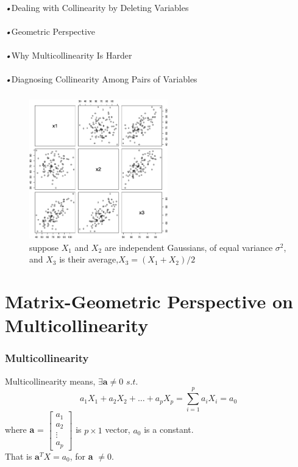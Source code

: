 \documentclass{beamer}
\begin{document}
\begin{frame}
\frametitle{}
\emph{•}Dealing with Collinearity by Deleting Variables
\\\mbox{}
\\\emph{•}Geometric Perspective
\\\mbox{}
\\\emph{•}Why Multicollinearity Is Harder
\\\mbox{}
\\\emph{•}Diagnosing Collinearity Among Pairs of Variables
\end{frame}

\begin{frame}
\frametitle{}
\begin{figure}[h]
\begin{center}
\includegraphics[width=6cm]{image01}
\end{center}
\caption{suppose $X_1$ and $X_2$ are independent Gaussians, of equal variance $\sigma^2$, and $X_3$ is their average,$X_3 = \left( X_1 + X_2 \right)/ 2$}
\end{figure}
\end{frame}


\section{Matrix-Geometric Perspective on Multicollinearity}
\begin{frame}
\frametitle{Multicollinearity}
Multicollinearity means, $\exists \textbf{a} \neq 0 \,\,s.t.$
\begin{equation*}
  a_1X_1+a_2X_2+\hdots + a_pX_p=\sum_{i=1}^{p}a_iX_i=a_0
\end{equation*}
where 
\textbf{a} = $\begin{bmatrix}
a_1
\\a_2
\\\vdots 
\\a_p
\end{bmatrix}$ 
is $p \times 1$ vector, $a_0$ is a constant.
\\That is $\textbf{a}^{T} X = a_0$, for \textbf{a} $ \neq 0$.
\end{frame}
\end{document}

